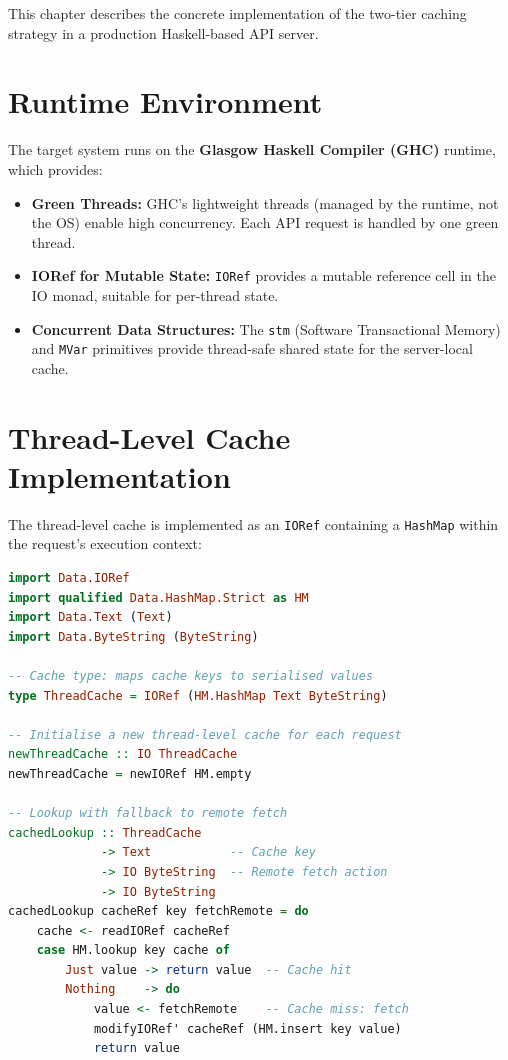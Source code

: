 \documentclass[12pt,a4paper]{report}
\begin{document}
This chapter describes the concrete implementation of the two-tier caching strategy in a production Haskell-based API server.

\section{Runtime Environment}

The target system runs on the \textbf{Glasgow Haskell Compiler (GHC)} runtime, which provides:

\begin{itemize}
    \item \textbf{Green Threads:} GHC's lightweight threads (managed by the runtime, not the OS) enable high concurrency. Each API request is handled by one green thread.
    \item \textbf{IORef for Mutable State:} \texttt{IORef} provides a mutable reference cell in the IO monad, suitable for per-thread state.
    \item \textbf{Concurrent Data Structures:} The \texttt{stm} (Software Transactional Memory) and \texttt{MVar} primitives provide thread-safe shared state for the server-local cache.
\end{itemize}

\section{Thread-Level Cache Implementation}

The thread-level cache is implemented as an \texttt{IORef} containing a \texttt{HashMap} within the request's execution context:

\begin{lstlisting}[language=Haskell, caption={Thread-Level Cache: Core Data Structure}]
import Data.IORef
import qualified Data.HashMap.Strict as HM
import Data.Text (Text)
import Data.ByteString (ByteString)

-- Cache type: maps cache keys to serialised values
type ThreadCache = IORef (HM.HashMap Text ByteString)

-- Initialise a new thread-level cache for each request
newThreadCache :: IO ThreadCache
newThreadCache = newIORef HM.empty

-- Lookup with fallback to remote fetch
cachedLookup :: ThreadCache
             -> Text           -- Cache key
             -> IO ByteString  -- Remote fetch action
             -> IO ByteString
cachedLookup cacheRef key fetchRemote = do
    cache <- readIORef cacheRef
    case HM.lookup key cache of
        Just value -> return value  -- Cache hit
        Nothing    -> do
            value <- fetchRemote    -- Cache miss: fetch
            modifyIORef' cacheRef (HM.insert key value)
            return value
\end{lstlisting}
\end{document}
